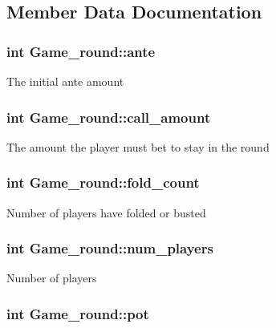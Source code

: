 \subsection{Member Data Documentation}
\hypertarget{structGame__round_ae714f80e2818785c32f96a65385f52ff}{
\subsubsection[{ante}]{\setlength{\rightskip}{0pt plus 5cm}int Game\+\_\+round\+::ante}}\label{structGame__round_ae714f80e2818785c32f96a65385f52ff}
The initial ante amount \hypertarget{structGame__round_abc13ce196b64a82d21cb90cf9f32c6aa}{
\subsubsection[{call\+\_\+amount}]{\setlength{\rightskip}{0pt plus 5cm}int Game\+\_\+round\+::call\+\_\+amount}}\label{structGame__round_abc13ce196b64a82d21cb90cf9f32c6aa}
The amount the player must bet to stay in the round \hypertarget{structGame__round_a611e1e50b9e40e7662777fbb81476f96}{
\subsubsection[{fold\+\_\+count}]{\setlength{\rightskip}{0pt plus 5cm}int Game\+\_\+round\+::fold\+\_\+count}}\label{structGame__round_a611e1e50b9e40e7662777fbb81476f96}
Number of players have folded or busted \hypertarget{structGame__round_ad4d30404f990b156abfaa4ad33987b21}{
\subsubsection[{num\+\_\+players}]{\setlength{\rightskip}{0pt plus 5cm}int Game\+\_\+round\+::num\+\_\+players}}\label{structGame__round_ad4d30404f990b156abfaa4ad33987b21}
Number of players \hypertarget{structGame__round_a78ef2676dde6281e79deb854970217e3}{
\subsubsection[{pot}]{\setlength{\rightskip}{0pt plus 5cm}int Game\+\_\+round\+::pot}}\label{structGame__round_a78ef2676dde6281e79deb854970217e3}
